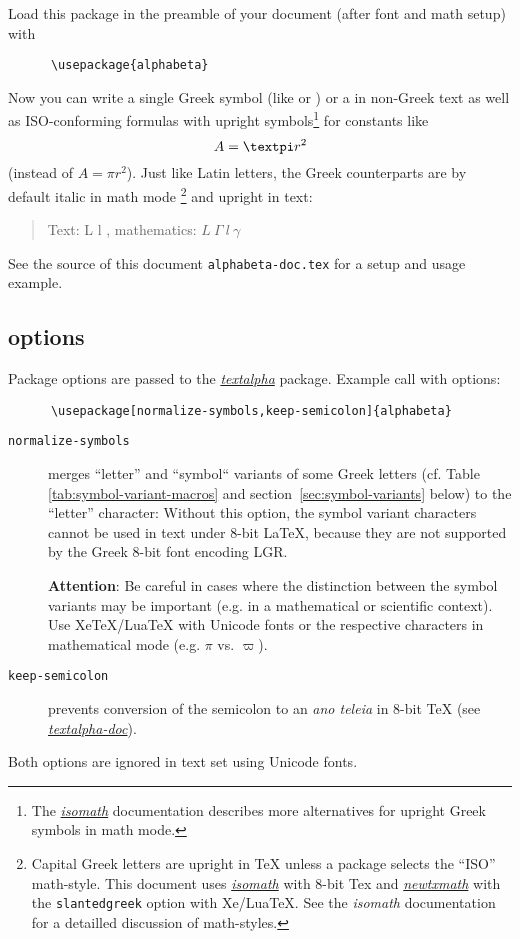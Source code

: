 \documentclass[a4paper]{scrartcl}
\newcommand{\pkgref}[1]{\emph{\href{https://ctan.org/pkg/#1}{#1}}}
\begin{document}
Load this package in the preamble of your document (after font and math
setup) with
\begin{verbatim}
      \usepackage{alphabeta}
\end{verbatim}
%
Now you can write a single Greek symbol (like \Psi{} or \mu{}) or
a \lambda\omicron\gamma\omicron\varsigma{} in non-Greek text as well as
ISO-conforming formulas with upright symbols\footnote{
  The \pkgref{isomath} documentation describes more alternatives
  for upright Greek symbols in math mode.}
for constants like
\[
   A = \text{\pi} r^2
\]
(instead of $A = \pi r^2$).
Just like Latin letters, the Greek counterparts are by default italic in
math mode%
\footnote{Capital Greek letters are upright in TeX unless a package selects
          the ``ISO'' math-style. This document uses \pkgref{isomath} with
          8-bit Tex and \pkgref{newtxmath} with the \texttt{slantedgreek}
          option with Xe/LuaTeX. See the \emph{isomath} documentation for a
          detailled discussion of math-styles.}
and upright in text:

\begin{quote}
  Text: L \Gamma{} l \gamma,
  mathematics: $ L \ \Gamma \ l \ \gamma $
\end{quote}
%
See the source of this document \texttt{alphabeta-doc.tex} for a setup and
usage example.


\subsection{options}

Package options are passed to the \href{textalpha-doc.pdf}{\emph{textalpha}}
package. Example call with options:

\begin{verbatim}
      \usepackage[normalize-symbols,keep-semicolon]{alphabeta}
\end{verbatim}

\begin{description}
\item[\texttt{normalize-symbols}] \label{item:normalize-symbols}
  merges ``letter'' and ``symbol`` variants of some Greek letters
  (cf. Table\,\ref{tab:symbol-variant-macros} and
  section~\ref{sec:symbol-variants} below) to the ``letter'' character:
  Without this option, the symbol variant characters cannot be used in text
  under 8-bit LaTeX, because they are not supported by the Greek 8-bit font
  encoding LGR.

  \textbf{Attention}: Be careful in cases where the distinction between the
  symbol variants may be important (e.g. in a mathematical or scientific
  context). Use XeTeX/LuaTeX with Unicode fonts or the respective characters
  in mathematical mode (e.g. $\pi$ vs. $\varpi$).

\item[\texttt{keep-semicolon}]
  prevents conversion of the semicolon to an \emph{ano teleia} in 8-bit TeX
  (see \emph{\href{textalpha-doc.pdf}{textalpha-doc}}).
\end{description}
%
Both options are ignored in text set using Unicode fonts.
\end{document}
